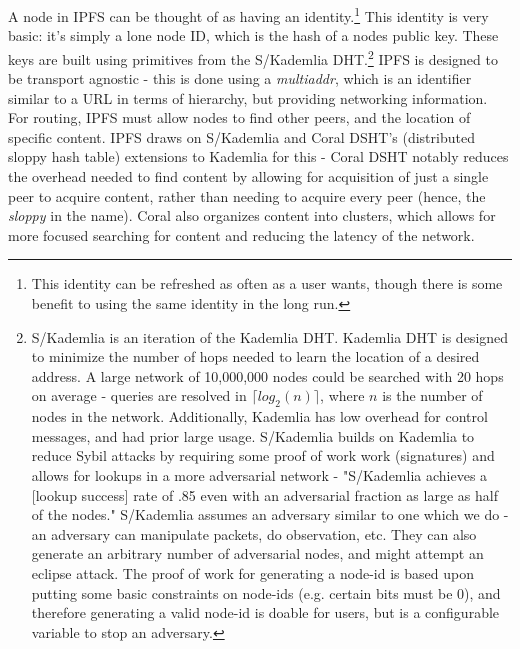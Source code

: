 \documentclass[12pt]{report}
\begin{document}
A node in IPFS can be thought of as having an identity.\footnote{This identity can be refreshed as often as a user wants, though there is some benefit to using the same identity in the long run.} This identity is very basic: it's simply a lone node ID, which is the hash of a nodes public key. These keys are built using primitives from the S/Kademlia DHT.\footnote{S/Kademlia is an iteration of the Kademlia DHT. Kademlia DHT is designed to minimize the number of hops needed to learn the location of a desired address.\cite{kademlia} A large network of 10,000,000 nodes could be searched with 20 hops on average - queries are resolved in $\lceil log_2(n) \rceil$, where $n$ is the number of nodes in the network.\cite{ipfs} Additionally, Kademlia has low overhead for control messages, and had prior large usage.\cite{ipfs} S/Kademlia builds on Kademlia to reduce Sybil attacks by requiring some proof of work work (signatures) and allows for lookups in a more adversarial network - "S/Kademlia achieves a [lookup success] rate of .85 even with an adversarial fraction as large as half of the nodes."\cite{ipfs} S/Kademlia assumes an adversary similar to one which we do - an adversary can manipulate packets, do observation, etc. They can also generate an arbitrary number of adversarial nodes, and might attempt an eclipse attack.\cite{skademlia} The proof of work for generating a node-id is based upon putting some basic constraints on node-ids (e.g. certain bits must be 0), and therefore generating a valid node-id is doable for users, but is a configurable variable to stop an adversary.\cite{skademlia}} IPFS is designed to be transport agnostic - this is done using a \emph{multiaddr}, which is an identifier similar to a URL in terms of hierarchy, but providing networking information. For routing, IPFS must allow nodes to find other peers, and the location of specific content. IPFS draws on S/Kademlia and Coral DSHT's (distributed sloppy hash table) extensions to Kademlia for this - Coral DSHT notably reduces the overhead needed to find content by allowing for acquisition of just a single peer to acquire content, rather than needing to acquire every peer (hence, the \emph{sloppy} in the name). Coral also organizes content into clusters, which allows for more focused searching for content and reducing the latency of the network.
\end{document}

